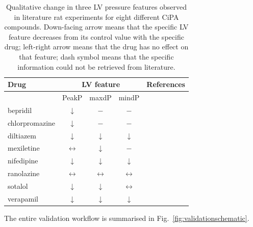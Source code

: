 \begin{table}[!ht]
    \myfloatalign
    \begin{tabular}{lcccl}
    \hline
    \textbf{Drug}           & \multicolumn{3}{c}{\textbf{LV feature}} & \textbf{References} \\
    \hline
    & PeakP & maxdP & mindP & \\
    \hline
    bepridil       & $\downarrow$ & $-$ & $-$ & \cite{Leiris:1984, Amsterdam:1988, Huizer:1987} \\
    chlorpromazine & $\downarrow$ & $-$ & $-$ & \cite{Katsuoka:1989, Langslet:1971, Sakai:2017} \\
    diltiazem      & $\downarrow$ & $\downarrow$ & $\downarrow$ & \cite{Flaim:1982, Koltai:1989, Dong:1997} \\
    mexiletine     & $\leftrightarrow$ & $\downarrow$ & $-$ & \cite{Kamiyama:1995, Hesketh:2020, Marshall:1981} \\
    nifedipine     & $\downarrow$ & $\downarrow$ & $\downarrow$ & \cite{Dong:1997, Saponara:2007, Nishimura:1992} \\
    ranolazine     & $\leftrightarrow$ & $\leftrightarrow$ & $\leftrightarrow$ & \cite{Wang:2007, Hwang:2009, Wang:2019} \\
    sotalol        & $\downarrow$ & $\downarrow$ & $\leftrightarrow$ & \cite{Mackin:2019, Peralta:2000, Hoffmeister:1988} \\
    verapamil      & $\downarrow$ & $\downarrow$ & $\downarrow$ & \cite{Simonovic:2019, Stojic:2017, Kolar:1990} \\
    \hline
    \end{tabular}
    \caption{Qualitative change in three LV pressure features observed in literature rat experiments for eight different CiPA compounds. Down-facing arrow means that the specific LV feature decreases from its control value with the specific drug; left-right arrow means that the drug has no effect on that feature; dash symbol means that the specific information could not be retrieved from literature.}
    \label{tab:drugvalidationrefs}
\end{table}


\noindent
The entire validation workflow is summarised in Fig.~\ref{fig:validationschematic}.

